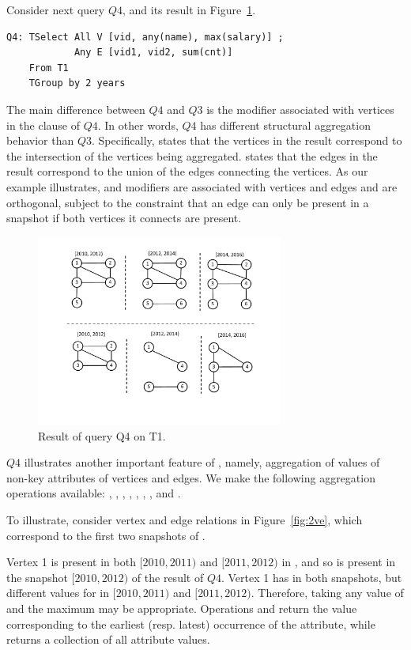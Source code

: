 Consider next query $Q4$, and its result in
Figure~\ref{fig:tg_all_any}.

\begin{verbatim}
Q4: TSelect All V [vid, any(name), max(salary)] ; 
            Any E [vid1, vid2, sum(cnt)] 
    From T1 
    TGroup by 2 years
\end{verbatim}

The main difference between $Q4$ and $Q3$ is the  modifier
associated with vertices in the  clause of $Q4$.  In
other words, $Q4$ has different structural aggregation behavior than
$Q3$.  Specifically,  states that the vertices in the
result correspond to the intersection of the vertices being
aggregated.   states that the edges in the result
correspond to the union of the edges connecting the vertices.  As our
example illustrates,  and  modifiers are
associated with vertices and edges and are orthogonal, subject to the
constraint that an edge can only be present in a snapshot if both
vertices it connects are present.

\begin{figure}
\includegraphics[width=3.2in]{figs/TGroupAllAny.pdf}
\caption{Result of query Q4 on T1.}
\label{fig:tg_all_any}
\end{figure}

$Q4$ illustrates another important feature of \ql, namely, aggregation
of values of non-key attributes of vertices and edges.  We make the
following aggregation operations available: ,
, , , , ,
, and .

To illustrate, consider vertex and edge relations in
Figure~\ref{fig:2ve}, which correspond to the first two snapshots of
.  

Vertex 1 is present in both $[2010, 2011)$ and $[2011, 2012)$ in
, and so is present in the snapshot $[2010, 2012)$ of the
result of $Q4$.  Vertex 1 has  in both
snapshots, but different values for  in $[2010, 2011)$
and $[2011, 2012)$.  Therefore, taking any value of  and
the maximum  may be appropriate.  Operations
 and  return the value corresponding to the
earliest (resp. latest) occurrence of the attribute, while
 returns a collection of all attribute values.

